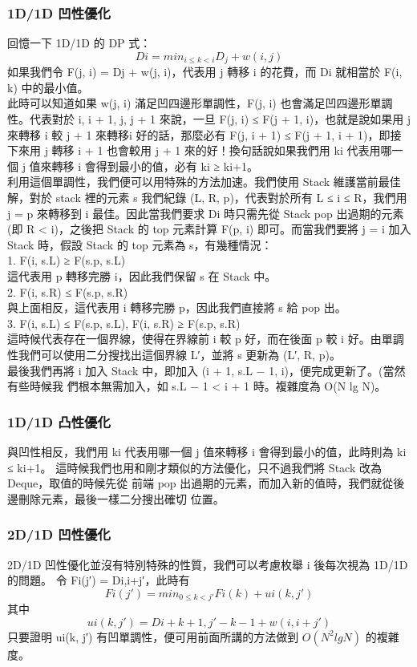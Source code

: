 \documentclass{article}
\begin{document}
\subsubsection{1D/1D 凹性優化}
回憶一下 1D/1D 的 DP 式：
$$Di = min_{i≤k<i} D_j + w(i, j)$$
如果我們令 F(j, i) = Dj + w(j, i)，代表用 j 轉移 i 的花費，而 Di 就相當於 F(i, k) 中的最小值。\\
此時可以知道如果 w(j, i) 滿足凹四邊形單調性，F(j, i) 也會滿足凹四邊形單調性。代表對於
i, i + 1, j, j + 1 來說，一旦 F(j, i) ≤ F(j + 1, i)，也就是說如果用 j 來轉移 i 較 j + 1 來轉移i 好的話，那麼必有 F(j, i + 1) ≤ F(j + 1, i + 1)，即接下來用 j 轉移 i + 1 也會較用 j + 1 來的好！換句話說如果我們用 ki 代表用哪一個 j 值來轉移 i 會得到最小的值，必有 ki ≥ ki+1。\\
利用這個單調性，我們便可以用特殊的方法加速。我們使用 Stack 維護當前最佳解，對於
stack 裡的元素 s 我們紀錄 (L, R, p)，代表對於所有 L ≤ i ≤ R，我們用 j = p 來轉移到 i 最佳。因此當我們要求 Di 時只需先從 Stack pop 出過期的元素 (即 R < i)，之後把 Stack 的
top 元素計算 F(p, i) 即可。而當我們要將 j = i 加入 Stack 時，假設 Stack 的 top 元素為 s，有幾種情況：\\
1. F(i, s.L) ≥ F(s.p, s.L)\\
這代表用 p 轉移完勝 i，因此我們保留 s 在 Stack 中。\\
2. F(i, s.R) ≤ F(s.p, s.R)\\
與上面相反，這代表用 i 轉移完勝 p，因此我們直接將 s 給 pop 出。\\
3. F(i, s.L) ≤ F(s.p, s.L), F(i, s.R) ≥ F(s.p, s.R)\\
這時候代表存在一個界線，使得在界線前 i 較 p 好，而在後面 p 較 i 好。由單調性我們可以使用二分搜找出這個界線 L′，並將 s 更新為 (L′, R, p)。\\
最後我們再將 i 加入 Stack 中，即加入 (i + 1, s.L − 1, i)，便完成更新了。(當然有些時候我
們根本無需加入，如 s.L − 1 < i + 1 時。複雜度為 O(N lg N)。\\
\subsubsection{1D/1D 凸性優化}
與凹性相反，我們用 ki 代表用哪一個 j 值來轉移 i 會得到最小的值，此時則為 ki ≤ ki+1。
這時候我們也用和剛才類似的方法優化，只不過我們將 Stack 改為 Deque，取值的時候先從
前端 pop 出過期的元素，而加入新的值時，我們就從後邊刪除元素，最後一樣二分搜出確切
位置。
\subsubsection{2D/1D 凹性優化}
2D/1D 凹性優化並沒有特別特殊的性質，我們可以考慮枚舉 i 後每次視為 1D/1D 的問題。
令 Fi(j′) = Di,i+j′，此時有
$$Fi(j′) = min_{0≤k<j′} Fi(k) + ui(k, j′)$$
其中
$$ui(k, j′) = Di+k+1,j′−k−1 + w(i, i + j′)$$
只要證明 ui(k, j′) 有凹單調性，便可用前面所講的方法做到 $O(N^2 lg N)$ 的複雜度。
\end{document}

